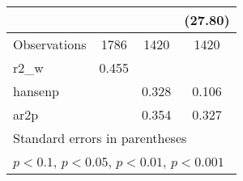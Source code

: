 {\begin{tabular}{l*{3}{c}}
                    &                     &                     &     (27.80)         \\
\hline
Observations        &        1786         &        1420         &        1420         \\
r2\_w                &       0.455         &                     &                     \\
hansenp             &                     &       0.328         &       0.106         \\
ar2p                &                     &       0.354         &       0.327         \\
\hline\hline
\multicolumn{4}{l}{\footnotesize Standard errors in parentheses}\\
\multicolumn{4}{l}{\footnotesize \sym{+} \(p<0.1\), \sym{*} \(p<0.05\), \sym{**} \(p<0.01\), \sym{***} \(p<0.001\)}\\
\end{tabular}
}

